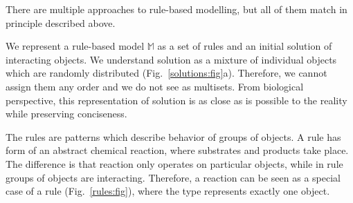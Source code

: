 \documentclass[12pt]{fithesis2}
\begin{document}
There are multiple approaches to rule-based modelling, but all of them match in principle described above.

We represent a rule-based model $\mathds{M}$ as a set of rules and an initial solution of interacting objects. We understand solution as a mixture of individual objects which are randomly distributed (Fig.~\ref{solutions:fig}a). Therefore, we cannot assign them any order and we do not see as multisets. From biological perspective, this representation of solution is as close as is possible to the reality while preserving conciseness.

The rules are patterns which describe behavior of groups of objects. A rule has form of an abstract chemical reaction, where substrates and products take place. The difference is that reaction only operates on particular objects, while in rule groups of objects are interacting. Therefore, a reaction can be seen as a special case of a rule (Fig.~\ref{rules:fig}), where the type represents exactly one object.
\end{document}
